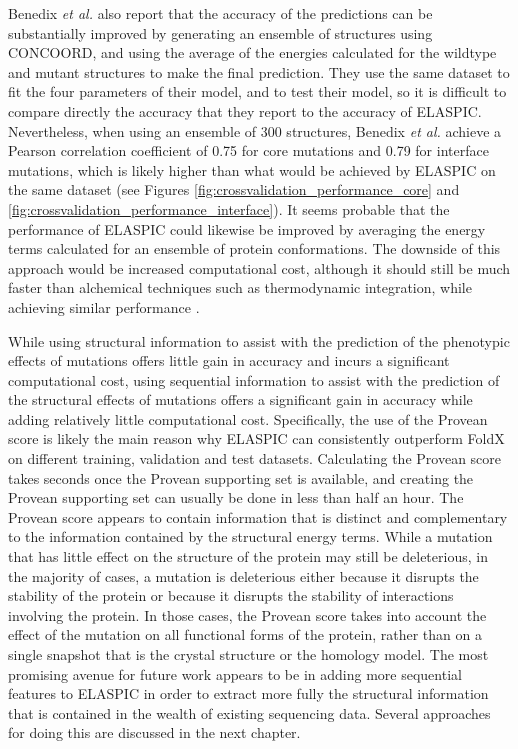 Benedix \textit{et al.} \cite{benedix_predicting_2009} also report that the accuracy of the predictions can be substantially improved by generating an ensemble of structures using CONCOORD, and using the average of the energies calculated for the wildtype and mutant structures to make the final prediction. They use the same dataset to fit the four parameters of their model, and to test their model, so it is difficult to compare directly the accuracy that they report to the accuracy of ELASPIC. Nevertheless, when using an ensemble of 300 structures, Benedix \textit{et al.} achieve a Pearson correlation coefficient of 0.75 for core mutations and 0.79 for interface mutations, which is likely higher than what would be achieved by ELASPIC on the same dataset (see Figures \ref{fig:crossvalidation_performance_core} and \ref{fig:crossvalidation_performance_interface}). It seems probable that the performance of ELASPIC could likewise be improved by averaging the energy terms calculated for an ensemble of protein conformations. The downside of this approach would be increased computational cost, although it should still be much faster than alchemical techniques such as thermodynamic integration, while achieving similar performance \cite{seeliger_protein_2010}.

While using structural information to assist with the prediction of the phenotypic effects of mutations offers little gain in accuracy and incurs a significant computational cost, using sequential information to assist with the prediction of the structural effects of mutations offers a significant gain in accuracy while adding relatively little computational cost. Specifically, the use of the Provean score is likely the main reason why ELASPIC can consistently outperform FoldX on different training, validation and test datasets. Calculating the Provean score takes seconds once the Provean supporting set is available, and creating the Provean supporting set can usually be done in less than half an hour. The Provean score appears to contain information that is distinct and complementary to the information contained by the structural energy terms. While a mutation that has little effect on the structure of the protein may still be deleterious, in the majority of cases, a mutation is deleterious either because it disrupts the stability of the protein or because it disrupts the stability of interactions involving the protein. In those cases, the Provean score takes into account the effect of the mutation on all functional forms of the protein, rather than on a single snapshot that is the crystal structure or the homology model. The most promising avenue for future work appears to be in adding more sequential features to ELASPIC in order to extract more fully the structural information that is contained in the wealth of existing sequencing data. Several approaches for doing this are discussed in the next chapter.
